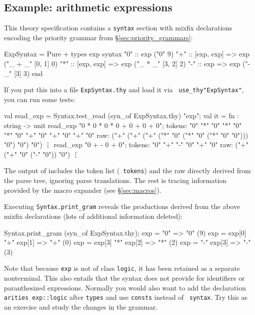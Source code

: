 \subsection{Example: arithmetic expressions}
This theory specification contains a {\tt syntax} section with mixfix
declarations encoding the priority grammar from
\S\ref{sec:priority_grammars}:
\begin{ttbox}
ExpSyntax = Pure +
types
  exp
syntax
  "0" :: exp                 ("0"      9)
  "+" :: [exp, exp] => exp   ("_ + _"  [0, 1] 0)
  "*" :: [exp, exp] => exp   ("_ * _"  [3, 2] 2)
  "-" :: exp => exp          ("- _"    [3] 3)
end
\end{ttbox}
If you put this into a file {\tt ExpSyntax.thy} and load it via {\tt
  use_thy"ExpSyntax"}, you can run some tests:
\begin{ttbox}
val read_exp = Syntax.test_read (syn_of ExpSyntax.thy) "exp";
{\out val it = fn : string -> unit}
read_exp "0 * 0 * 0 * 0 + 0 + 0 + 0";
{\out tokens: "0" "*" "0" "*" "0" "*" "0" "+" "0" "+" "0" "+" "0"}
{\out raw: ("+" ("+" ("+" ("*" "0" ("*" "0" ("*" "0" "0"))) "0") "0") "0")}
{\out \vdots}
read_exp "0 + - 0 + 0";
{\out tokens: "0" "+" "-" "0" "+" "0"}
{\out raw: ("+" ("+" "0" ("-" "0")) "0")}
{\out \vdots}
\end{ttbox}
The output of  includes the token list ({\tt
  tokens}) and the raw \AST{} directly derived from the parse tree,
ignoring parse \AST{} translations.  The rest is tracing information
provided by the macro expander (see \S\ref{sec:macros}).

Executing {\tt Syntax.print_gram} reveals the productions derived from the
above mixfix declarations (lots of additional information deleted):
\begin{ttbox}
Syntax.print_gram (syn_of ExpSyntax.thy);
{\out exp = "0"  => "0" (9)}
{\out exp = exp[0] "+" exp[1]  => "+" (0)}
{\out exp = exp[3] "*" exp[2]  => "*" (2)}
{\out exp = "-" exp[3]  => "-" (3)}
\end{ttbox}

Note that because {\tt exp} is not of class {\tt logic}, it has been
retained as a separate nonterminal.  This also entails that the syntax
does not provide for identifiers or paranthesized expressions.
Normally you would also want to add the declaration {\tt arities
  exp::logic} after {\tt types} and use {\tt consts} instead of {\tt
  syntax}.  Try this as an exercise and study the changes in the
grammar.

